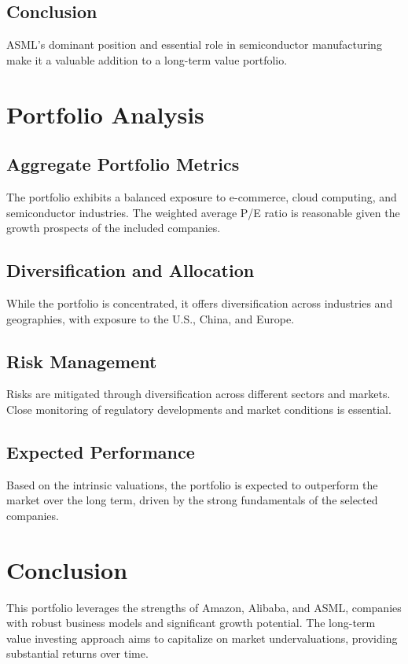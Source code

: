 \documentclass[12pt]{report}
\begin{document}
\section{Conclusion}
ASML's dominant position and essential role in semiconductor manufacturing make it a valuable addition to a long-term value portfolio.

\chapter{Portfolio Analysis}
\section{Aggregate Portfolio Metrics}
The portfolio exhibits a balanced exposure to e-commerce, cloud computing, and semiconductor industries. The weighted average P/E ratio is reasonable given the growth prospects of the included companies.

\section{Diversification and Allocation}
While the portfolio is concentrated, it offers diversification across industries and geographies, with exposure to the U.S., China, and Europe.

\section{Risk Management}
Risks are mitigated through diversification across different sectors and markets. Close monitoring of regulatory developments and market conditions is essential.

\section{Expected Performance}
Based on the intrinsic valuations, the portfolio is expected to outperform the market over the long term, driven by the strong fundamentals of the selected companies.

\chapter{Conclusion}
This portfolio leverages the strengths of Amazon, Alibaba, and ASML, companies with robust business models and significant growth potential. The long-term value investing approach aims to capitalize on market undervaluations, providing substantial returns over time.
\end{document}
